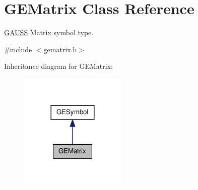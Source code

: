\hypertarget{class_g_e_matrix}{\section{G\-E\-Matrix Class Reference}
\label{class_g_e_matrix}
}


\hyperlink{class_g_a_u_s_s}{G\-A\-U\-S\-S} Matrix symbol type.  




{\ttfamily \#include $<$gematrix.\-h$>$}



Inheritance diagram for G\-E\-Matrix\-:
\nopagebreak
\begin{figure}[H]
\begin{center}
\leavevmode
\includegraphics[width=144pt]{class_g_e_matrix__inherit__graph}
\end{center}
\end{figure}

